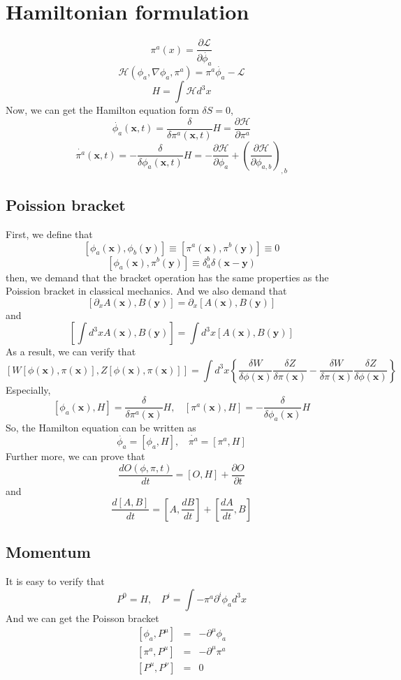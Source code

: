 \documentclass[cyan]{elegantnote}
\begin{document}
\section{Hamiltonian formulation}
\[\pi^a(x) = \frac{\partial \mathcal{L}}{\partial \dot{\phi_a}}\]
\[\mathcal{H}(\phi_a,\nabla \phi_a,\pi^a) = \pi^a \dot{\phi_a} - \mathcal{L}\]
\[H = \int \mathcal{H} d^3 x\]
Now, we can get the Hamilton equation form $\delta S =0$,
\[\dot{\phi_a}(\bm{x},t) = \frac{\delta}{\delta \pi^a(\bm{x},t)} H = \frac{\partial \mathcal{H}}{\partial \pi^a}\]
\[\dot{\pi^a}(\bm{x},t) = -\frac{\delta}{\delta \phi_a(\bm{x},t)} H = - \frac{\partial \mathcal{H}}{\partial \phi_a} + \left(\frac{\partial \mathcal{H}}{\partial \phi_{a,b}}\right)_{,b}\]

\subsection{Poission bracket}

First, we define that
\[[\phi_a(\bm{x}),\phi_b(\bm{y})] \equiv [\pi^a(\bm{x}),\pi^b(\bm{y})] \equiv 0\]
\[[\phi_a(\bm{x}),\pi^b(\bm{y})] \equiv \delta^{b}_{a} \delta(\bm{x}-\bm{y})\]
then, we demand that the bracket operation has the same properties as the Poission bracket in classical mechanics. And we also demand that
\[[\partial_x A(\bm{x}),B(\bm{y})] = \partial_x [A(\bm{x}),B(\bm{y})]\]
and
\[\left[\int d^3 x A(\bm{x}),B(\bm{y})\right] = \int d^3 x [A(\bm{x}),B(\bm{y})]\]
As a result, we can verify that
\[[W[\phi(\bm{x}),\pi(\bm{x})],Z[\phi(\bm{x}),\pi(\bm{x})]] = \int d^3x \left\{ \frac{\delta W}{\delta \phi(\bm{x})} \frac{\delta Z}{\delta \pi(\bm{x})} - \frac{\delta W}{\delta \pi(\bm{x})} \frac{\delta Z}{\delta \phi(\bm{x})} \right\}\]
Especially,
\[[\phi_a(\bm{x}),H] = \frac{\delta }{\delta \pi^a(\bm{x})} H, \ \ \ \ [\pi^a(\bm{x}),H] = -\frac{\delta }{\delta \phi_a(\bm{x})} H\]
So, the Hamilton equation can be written as
\[\dot{\phi_a} = [\phi_a,H], \ \ \ \ \dot{\pi^a} = [\pi^a,H]\]
Further more, we can prove that
\[\frac{dO(\phi,\pi,t)}{dt} = [O,H] + \frac{\partial O}{\partial t}\]
and
\[\frac{d[A,B]}{dt} = [A,\frac{dB}{dt}] + [\frac{dA}{dt},B]  \]

\subsection{Momentum}

It is easy to verify that
\[P^{0} = H, \ \ \ \ P^{i} = \int -\pi^a \partial^i \phi_a d^3 x\]
And we can get the Poisson bracket
\begin{eqnarray}
	\left[\phi_a,P^{\mu}\right] &=& -\partial^{\mu} \phi_a \nonumber \\
	\left[\pi^a,P^{\mu}\right] &=& -\partial^{\mu} \pi^a \nonumber \\
	\left[P^{\mu},P^{\nu}\right] &=& 0 \nonumber 
\end{eqnarray}
\end{document}
